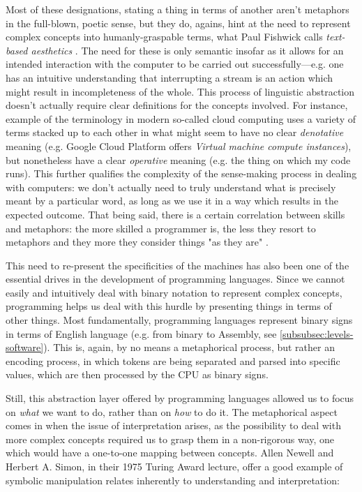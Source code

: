 Most of these designations, stating a thing in terms of another aren't metaphors in the full-blown, poetic sense, but they do, agains, hint at the need to represent complex concepts into humanly-graspable terms, what Paul Fishwick calls \emph{text-based aesthetics} \citep{fishwick_aesthetic_2006a}. The need for these is only semantic insofar as it allows for an intended interaction with the computer to be carried out successfully—e.g. one has an intuitive understanding that interrupting a stream is an action which might result in incompleteness of the whole. This process of linguistic abstraction doesn't actually require clear definitions for the concepts involved. For instance, example of the terminology in modern so-called cloud computing uses a variety of terms stacked up to each other in what might seem to have no clear \emph{denotative} meaning (e.g. Google Cloud Platform offers \emph{Virtual machine compute instances}), but nonetheless have a clear \emph{operative} meaning (e.g. the thing on which my code runs). This further qualifies the complexity of the sense-making process in dealing with computers: we don't actually need to truly understand what is precisely meant by a particular word, as long as we use it in a way which results in the expected outcome. That being said, there is a certain correlation between skills and metaphors: the more skilled a programmer is, the less they resort to metaphors and they more they consider things "as they are" \citep{mckeithen_knowledge_1981}.

This need to re-present the specificities of the machines has also been one of the essential drives in the development of programming languages. Since we cannot easily and intuitively deal with binary notation to represent complex concepts, programming helps us deal with this hurdle by presenting things in terms of other things. Most fundamentally, programming languages represent binary signs in terms of English language (e.g. from binary to Assembly, see \ref{subsubsec:levels-software}). This is, again, by no means a metaphorical process, but rather an encoding process, in which tokens are being separated and parsed into specific values, which are then processed by the CPU as binary signs.

Still, this abstraction layer offered by programming languages allowed us to focus on \emph{what} we want to do, rather than on \emph{how} to do it. The metaphorical aspect comes in when the issue of interpretation arises, as the possibility to deal with more complex concepts required us to grasp them in a non-rigorous way, one which would have a one-to-one mapping between concepts. Allen Newell and Herbert A. Simon, in their 1975 Turing Award lecture, offer a good example of symbolic manipulation relates inherently to understanding and interpretation:

